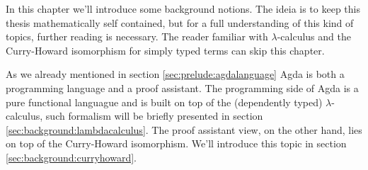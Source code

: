 In this chapter we'll introduce some background notions. The ideia is to keep this thesis
mathematically self contained, but for a full understanding of this kind of topics, further
reading is necessary. The reader familiar with $\lambda$-calculus and the Curry-Howard isomorphism for simply typed terms can skip this chapter.

As we already mentioned in section \ref{sec:prelude:agdalanguage} Agda is both a programming language and a proof assistant. The programming side of Agda is a pure functional languague and is built on top of the (dependently typed) $\lambda$-calculus, such formalism will be briefly presented in section \ref{sec:background:lambdacalculus}. The proof assistant view, on the other hand, lies on top of the Curry-Howard isomorphism. We'll introduce this topic in section \ref{sec:background:curryhoward}. 
